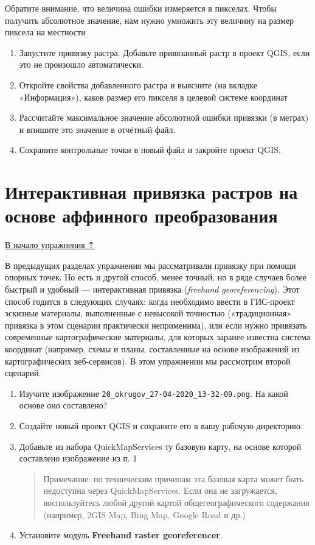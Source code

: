 \documentclass[
  12pt,
]{book}
\begin{document}
Обратите внимание, что величина ошибки измеряется в пикселах. Чтобы получить абсолютное значение, нам нужно умножить эту величину на размер пиксела на местности

\begin{enumerate}
\def\labelenumi{\arabic{enumi}.}
\setcounter{enumi}{6}
\item
  Запустите привязку растра. Добавьте привязанный растр в проект QGIS, если это не произошло автоматически.
\item
  Откройте свойства добавленного растра и выясните (на вкладке «Информация»), каков размер его пикселя в целевой системе координат
\item
  Рассчитайте максимальное значение абсолютной ошибки привязки (в метрах) и впишите это значение в отчётный файл.
\item
  Сохраните контрольные точки в новый файл и закройте проект QGIS.
\end{enumerate}

\hypertarget{raster-reference-linear}{%
\section{Интерактивная привязка растров на основе аффинного преобразования}\label{raster-reference-linear}}

\protect\hyperlink{raster-reference}{В начало упражнения ⇡}

В предыдущих разделах упражнения мы рассматривали привязку при помощи опорных точек. Но есть и другой способ, менее точный, но в ряде случаев более быстрый и удобный --- интерактивная привязка (\emph{freehand georeferencing}). Этот способ годится в следующих случаях: когда необходимо ввести в ГИС-проект эскизные материалы, выполненные с невысокой точностью («традиционная» привязка в этом сценарии практически неприменима), или если нужно привязать современные картографические материалы, для которых заранее известна система координат (например, схемы и планы, составленные на основе изображений из картографических веб-сервисов). В этом упражнении мы рассмотрим второй сценарий.

\begin{enumerate}
\def\labelenumi{\arabic{enumi}.}
\item
  Изучите изображение \texttt{20\_okrugov\_27-04-2020\_13-32-09.png}. На какой основе оно составлено?
\item
  Создайте новый проект QGIS и сохраните его в вашу рабочую директорию.
\item
  Добавьте из набора QuickMapServices ту базовую карту, на основе которой составлено изображение из п. 1

  \begin{quote}
  Примечание: по техническим причинам эта базовая карта может быть недоступна через QuickMapServices. Если она не загружается, воспользуйтесь любой другой картой общегеографического содержания (например, 2GIS Map, Bing Map, Google Road и др.)
  \end{quote}
\item
  Установите модуль \textbf{Freehand raster georeferencer}.
\end{enumerate}
\end{document}
